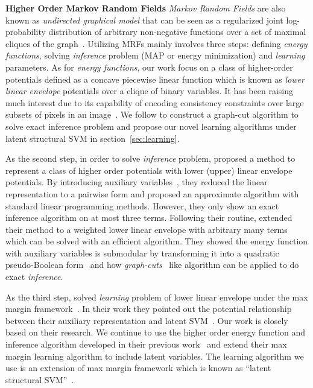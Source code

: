 \documentclass[sigconf,anonymous,review]{acmart}
\renewcommand{\citename}{\citet}
\renewcommand{\cite}{\citep}
\begin{document}
\textbf{Higher Order Markov Random Fields} \emph{Markov Random
  Fields} are also known as \emph{undirected graphical model}
that can be seen as a regularized joint log-probability
distribution of arbitrary non-negative functions over a set of
maximal cliques of the graph~\cite{bishop:2006:PRML}. Utilizing
MRFs mainly involves three steps: defining \emph{energy
  functions}, solving \emph{inference} problem (MAP or energy
minimization) and \emph{learning} parameters. As for \emph{energy
  functions}, our work focus on a class of higher-order
potentials defined as a concave piecewise linear function which
is known as \emph{lower linear envelope} potentials over a clique
of binary variables. It has been raising much interest due to its
capability of encoding consistency constraints over large subsets
of pixels in an image~\cite{Kohli:CVPR07,Nowozin:2011}. We follow
\citename{gouldlearning} to construct a graph-cut algorithm to
solve exact inference problem and propose our novel learning
algorithms under latent structural SVM in
section~\ref{sec:learning}.

As the second step, in order to solve \emph{inference} problem,
\citename{kohli2009robust} proposed a method to represent a class
of higher order potentials with lower (upper) linear envelope
potentials. By introducing auxiliary
variables~\cite{Kohli:CVPR10}, they reduced the linear
representation to a pairwise form and proposed an approximate
algorithm with standard linear programming methods. However, they
only show an exact inference algorithm on at most three terms.
Following their routine, \citename{gouldlearning} extended their
method to a weighted lower linear envelope with arbitrary many
terms which can be solved with an efficient algorithm. They
showed the energy function with auxiliary variables is submodular
by transforming it into a quadratic pseudo-Boolean
form~\cite{Boros:MATH02} and how
\emph{graph-cuts}~\cite{Hammer:1965, Boykov:ICCV01,
  Freedman:CVPR05} like algorithm can be applied to do exact
\emph{inference}.

As the third step, \citename{gouldlearning} solved
\emph{learning} problem of lower linear envelope under the max
margin framework~\cite{tsochantaridis2005large}. In their work
they pointed out the potential relationship between their
auxiliary representation and latent SVM~\cite{yu2009learning}.
Our work is closely based on their research. We continue to use
the higher order energy function and inference algorithm
developed in their previous work~\cite{Gould:ICML2011} and extend
their max margin learning algorithm to include latent variables.
The learning algorithm we use is an extension of max margin
framework which is known as ``latent structural
SVM''~\cite{yu2009learning}.
\end{document}
